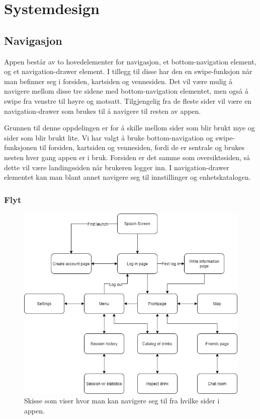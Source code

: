 \section{Systemdesign}
\subsection{Navigasjon}
Appen består av to hovedelementer for navigasjon, et bottom-navigation element, og et navigation-drawer element. I tillegg til disse har den en swipe-funksjon når man befinner seg i forsiden, kartsiden og vennesiden. Det vil være mulig å navigere mellom disse tre sidene med bottom-navigation elementet, men også å swipe fra venstre til høyre og motsatt. Tilgjengelig fra de fleste sider vil være en navigation-drawer som brukes til å navigere til resten av appen.

Grunnen til denne oppdelingen er for å skille mellom sider som blir brukt mye og sider som blir brukt lite. Vi har valgt å bruke bottom-navigation og swipe-funksjonen til forsiden, kartsiden og vennesiden, fordi de er sentrale og brukes nesten hver gang appen er i bruk. Forsiden er det samme som oversiktssiden, så dette vil være landingssiden når brukeren logger inn. I navigation-drawer elementet kan man blant annet navigere seg til innstillinger og enhetskatalogen.

\subsubsection{Flyt}

\begin{figure}[H]
    \centering
    \includegraphics[scale=0.5]{images/lille_promille_float_diagram.drawio.png}
    \caption{Skisse som viser hvor man kan navigere seg til fra hvilke sider i appen.}
\end{figure}

